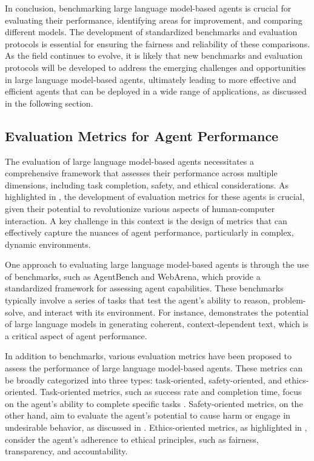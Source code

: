 \documentclass[11pt,a4paper]{article}
\begin{document}
In conclusion, benchmarking large language model-based agents is crucial for evaluating their performance, identifying areas for improvement, and comparing different models. The development of standardized benchmarks and evaluation protocols is essential for ensuring the fairness and reliability of these comparisons. As the field continues to evolve, it is likely that new benchmarks and evaluation protocols will be developed to address the emerging challenges and opportunities in large language model-based agents, ultimately leading to more effective and efficient agents that can be deployed in a wide range of applications, as discussed in the following section.


\subsection{Evaluation Metrics for Agent Performance}


The evaluation of large language model-based agents necessitates a comprehensive framework that assesses their performance across multiple dimensions, including task completion, safety, and ethical considerations. As highlighted in \cite{arxiv:1906.09379}, the development of evaluation metrics for these agents is crucial, given their potential to revolutionize various aspects of human-computer interaction. A key challenge in this context is the design of metrics that can effectively capture the nuances of agent performance, particularly in complex, dynamic environments.

One approach to evaluating large language model-based agents is through the use of benchmarks, such as AgentBench \cite{arxiv:2308.03688} and WebArena, which provide a standardized framework for assessing agent capabilities. These benchmarks typically involve a series of tasks that test the agent's ability to reason, problem-solve, and interact with its environment. For instance, \cite{doi:10.18653/v1/2021.naacl-main.341} demonstrates the potential of large language models in generating coherent, context-dependent text, which is a critical aspect of agent performance.

In addition to benchmarks, various evaluation metrics have been proposed to assess the performance of large language model-based agents. These metrics can be broadly categorized into three types: task-oriented, safety-oriented, and ethics-oriented. Task-oriented metrics, such as success rate and completion time, focus on the agent's ability to complete specific tasks \cite{doi:10.1038/s41746-024-01083-y}. Safety-oriented metrics, on the other hand, aim to evaluate the agent's potential to cause harm or engage in undesirable behavior, as discussed in \cite{arxiv:2402.11208}. Ethics-oriented metrics, as highlighted in \cite{arxiv:2405.11357}, consider the agent's adherence to ethical principles, such as fairness, transparency, and accountability.
\end{document}
